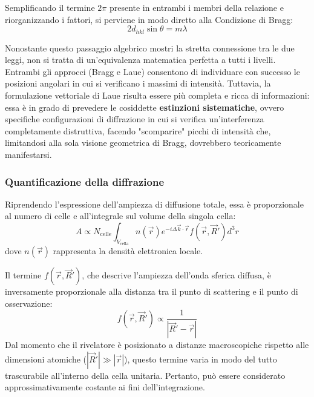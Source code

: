 Semplificando il termine \( 2\pi \) presente in entrambi i membri della relazione e riorganizzando i fattori, si perviene in modo diretto alla Condizione di Bragg:
\begin{equation}
    2d_{hkl} \sin\theta = m\lambda
\end{equation}

\begin{attention}
    Nonostante questo passaggio algebrico mostri la stretta connessione tra le due leggi, non si tratta di un'equivalenza matematica perfetta a tutti i livelli. 
    Entrambi gli approcci (Bragg e Laue) consentono di individuare con successo le posizioni angolari in cui si verificano i massimi di intensità.
    Tuttavia, la formulazione vettoriale di Laue risulta essere più completa e ricca di informazioni: essa è in grado di prevedere le cosiddette \textbf{estinzioni sistematiche}, 
    ovvero specifiche configurazioni di diffrazione in cui si verifica un'interferenza completamente distruttiva, facendo "scomparire" picchi di intensità che, limitandosi alla sola visione geometrica di Bragg, dovrebbero teoricamente manifestarsi.

\end{attention}

\subsubsection{Quantificazione della diffrazione}
Riprendendo l'espressione dell'ampiezza di diffusione totale, essa è proporzionale al numero di celle e all'integrale sul volume della singola cella:
\begin{equation}
    A \propto N_{\text{celle}} \int_{V_{\text{cella}}} n(\vec{r}) e^{-i \Delta\vec{k} \cdot \vec{r}} f(\vec{r}, \vec{R}') d^3r
\end{equation}
dove \( n(\vec{r}) \) rappresenta la densità elettronica locale.

Il termine \( f(\vec{r}, \vec{R}') \), che descrive l'ampiezza dell'onda sferica diffusa, è inversamente proporzionale alla distanza tra il punto di scattering e il punto di osservazione:
\begin{equation}
    f(\vec{r}, \vec{R}') \propto \frac{1}{|\vec{R}' - \vec{r}|}
\end{equation}
Dal momento che il rivelatore è posizionato a distanze macroscopiche rispetto alle dimensioni atomiche (\( |\vec{R}'| \gg |\vec{r}| \)), questo termine varia in modo del tutto trascurabile all'interno della cella unitaria. Pertanto, può essere considerato approssimativamente costante ai fini dell'integrazione.

